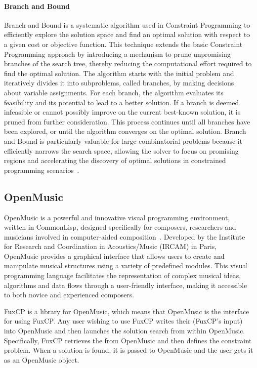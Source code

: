 \paragraph{Branch and Bound}
Branch and Bound is a systematic algorithm used in Constraint Programming to efficiently explore the solution space and find an optimal solution with respect to a given cost or objective function. This technique extends the basic Constraint Programming approach by introducing a mechanism to prune unpromising branches of the search tree, thereby reducing the computational effort required to find the optimal solution. The algorithm starts with the initial problem and iteratively divides it into subproblems, called branches, by making decisions about variable assignments. For each branch, the algorithm evaluates its feasibility and its potential to lead to a better solution. If a branch is deemed infeasible or cannot possibly improve on the current best-known solution, it is pruned from further consideration. This process continues until all branches have been explored, or until the algorithm converges on the optimal solution. Branch and Bound is particularly valuable for large combinatorial problems because it efficiently narrows the search space, allowing the solver to focus on promising regions and accelerating the discovery of optimal solutions in constrained programming scenarios~\cite{morrison2016branch}. 


\subsection{OpenMusic}
OpenMusic is a powerful and innovative visual programming environment, written in CommonLisp, designed specifically for composers, researchers and musicians involved in computer-aided composition~\cite{OpenMusic}. Developed by the Institute for Research and Coordination in Acoustics/Music (IRCAM) in Paris, OpenMusic provides a graphical interface that allows users to create and manipulate musical structures using a variety of predefined modules. This visual programming language facilitates the representation of complex musical ideas, algorithms and data flows through a user-friendly interface, making it accessible to both novice and experienced composers. 


FuxCP is a library for OpenMusic, which means that OpenMusic is the interface for using FuxCP. Any user wishing to use FuxCP writes their \cfs (FuxCP's input) into OpenMusic and then launches the solution search from within OpenMusic. Specifically, FuxCP retrieves the \cfs from OpenMusic and then defines the constraint problem. When a solution is found, it is passed to OpenMusic and the user gets it as an OpenMusic object.

